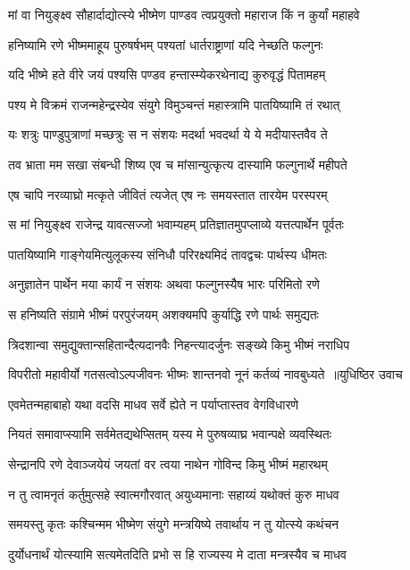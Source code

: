 \twolineshloka
{मां वा नियुङ्क्ष्व सौहार्दाद्योत्स्ये भीष्मेण पाण्डव}
{त्वप्रयुक्तो महाराज किं न कुर्यां महाहवे}


\twolineshloka
{हनिष्यामि रणे भीष्ममाहूय पुरुषर्षभम्}
{पश्यतां धार्तराष्ट्राणां यदि नेच्छति फल्गुनः}


\twolineshloka
{यदि भीष्मे हते वीरे जयं पश्यसि पण्डव}
{हन्तास्म्येकरथेनाद्य कुरुवृद्धं पितामहम्}


\twolineshloka
{पश्य मे विक्रमं राजन्महेन्द्रस्येव संयुगे}
{विमुञ्चन्तं महास्त्रामि पातयिष्यामि तं रथात्}


\twolineshloka
{यः शत्रुः पाण्डुपुत्राणां मच्छत्रुः स न संशयः}
{मदर्था भवदर्था ये ये मदीयास्तवैव ते}


\twolineshloka
{तव भ्राता मम सखा संबन्धी शिष्य एव च}
{मांसान्युत्कृत्य दास्यामि फल्गुनार्थे महीपते}


\twolineshloka
{एष चापि नरव्याघ्रो मत्कृते जीवितं त्यजेत्}
{एष नः समयस्तात तारयेम परस्परम्}


\twolineshloka
{स मां नियुङ्क्ष्व राजेन्द्र यावत्सज्जो भवाम्यहम्}
{प्रतिज्ञातमुपप्लाव्ये यत्तत्पार्थेन पूर्वतः}


\twolineshloka
{पातयिष्यामि गाङ्गेयमित्युलूकस्य संनिधौ}
{परिरक्ष्यमिदं तावद्वचः पार्थस्य धीमतः}


\twolineshloka
{अनुज्ञातेन पार्थेन मया कार्यं न संशयः}
{अथवा फल्गुनस्यैष भारः परिमितो रणे}


\twolineshloka
{स हनिष्यति संग्रामे भीष्मं परपुरंजयम्}
{अशक्यमपि कुर्याद्धि रणे पार्थः समुद्यतः}


\twolineshloka
{त्रिदशान्वा समुद्युक्तान्सहितान्दैत्यदानवैः}
{निहन्त्यादर्जुनः सङ्ख्ये किमु भीष्मं नराधिप}


\threelineshloka
{विपरीतो महावीर्यो गतसत्वोऽल्पजीवनः}
{भीष्मः शान्तनवो नूनं कर्तव्यं नावबुध्यते ॥युधिष्ठिर उवाच}
{}


\twolineshloka
{एवमेतन्महाबाहो यथा वदसि माधव}
{सर्वे ह्येते न पर्याप्तास्तव वेगविधारणे}


\twolineshloka
{नियतं समावाप्स्यामि सर्वमेतद्यथेप्सितम्}
{यस्य मे पुरुषव्याघ्र भवान्पक्षे व्यवस्थितः}


\twolineshloka
{सेन्द्रानपि रणे देवाञ्जयेयं जयतां वर}
{त्वया नाथेन गोविन्द किमु भीष्मं महारथम्}


\twolineshloka
{न तु त्वामनृतं कर्तुमुत्सहे स्वात्मगौरवात्}
{अयुध्यमानाः सहाय्यं यथोक्तं कुरु माधव}


\twolineshloka
{समयस्तु कृतः कश्चिन्मम भीष्मेण संयुगे}
{मन्त्रयिष्ये तवार्थाय न तु योत्स्ये कथंचन}


\twolineshloka
{दुर्योधनार्थं योत्स्यामि सत्यमेतदिति प्रभो}
{स हि राज्यस्य मे दाता मन्त्रस्यैव च माधव}


